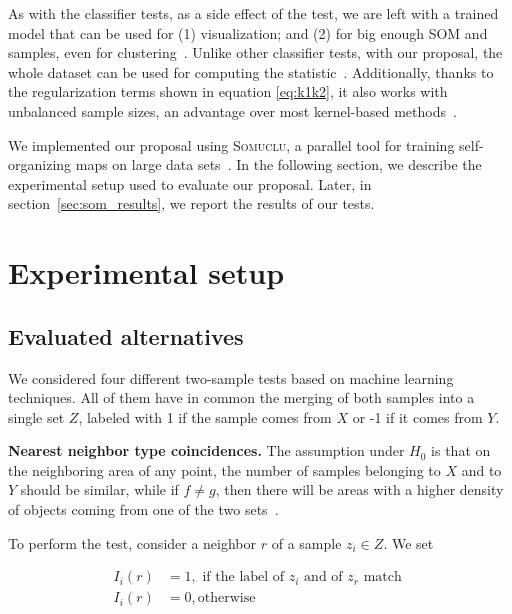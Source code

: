 As with the classifier tests, as a side effect of the test, we are left with a
trained model that can be used for (1) visualization; and (2) for big enough
\gls{SOM}  and samples, even for clustering~\cite{ultsch2005esom}.
Unlike other classifier tests, with our proposal, the whole dataset can be used
for computing the statistic~\cite{kirchler2020two}. Additionally, thanks to the
regularization terms shown in equation \ref{eq:k1k2}, it also works with
unbalanced sample sizes, an advantage over most kernel-based methods~\cite{song2021fast}.

We implemented our proposal using \textsc{Somuclu}, a parallel
tool for training self-organizing maps on large data sets~\cite{wittek_somoclu_2017}.
In the following section, we describe the experimental setup used to
evaluate our proposal.
Later, in section~\ref{sec:som_results}, we report the results of our tests.

\section{Experimental setup}
\label{sec:som_exp_setup}

\subsection{Evaluated alternatives}

We considered four different two-sample tests based on machine learning techniques.
All of them have in common the merging of both samples into a single set $Z$,
labeled with 1 if the sample comes from $X$ or -1 if it comes from $Y$.

\textbf{Nearest neighbor type coincidences.}
The assumption under $H_0$ is that on the neighboring area of any point, the number of samples
belonging to $X$ and to $Y$ should be similar, while if $f \neq g$, then there will be areas with
a higher density of objects coming from one of the two sets~\cite{Henze1988,Schilling1986b}.

To perform the test, consider a neighbor $r$ of a sample $z_i \in Z$. We set

\begin{equation}
\begin{split}
    I_i(r) &= 1, \textrm{ if the label of } z_i \textrm{ and of } z_r \textrm{ match }\\
    I_i(r) &= 0, \textrm{otherwise}
\end{split}
\end{equation}

